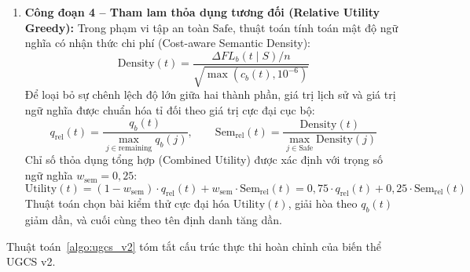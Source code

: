 \begin{enumerate}
    \item \textbf{Công đoạn 4 -- Tham lam thỏa dụng tương đối (Relative Utility Greedy):}
    Trong phạm vi tập an toàn $\text{Safe}$, thuật toán tính toán mật độ ngữ nghĩa có nhận thức chi phí (Cost-aware Semantic Density):
    \begin{equation}
    \text{Density}(t) = \frac{\Delta FL_b(t \mid S) / n}{\sqrt{\max(c_b(t), 10^{-6})}}
    \end{equation}
    Để loại bỏ sự chênh lệch độ lớn giữa hai thành phần, giá trị lịch sử và giá trị ngữ nghĩa được chuẩn hóa tỉ đối theo giá trị cực đại cục bộ:
    \begin{equation}
    q_{\text{rel}}(t) = \frac{q_b(t)}{\max_{j \in \text{remaining}} q_b(j)}, \qquad \text{Sem}_{\text{rel}}(t) = \frac{\text{Density}(t)}{\max_{j \in \text{Safe}} \text{Density}(j)}
    \end{equation}
    Chỉ số thỏa dụng tổng hợp (Combined Utility) được xác định với trọng số ngữ nghĩa $w_{\text{sem}} = 0{,}25$:
    \begin{equation}
    \text{Utility}(t) = (1 - w_{\text{sem}}) \cdot q_{\text{rel}}(t) + w_{\text{sem}} \cdot \text{Sem}_{\text{rel}}(t) = 0{,}75 \cdot q_{\text{rel}}(t) + 0{,}25 \cdot \text{Sem}_{\text{rel}}(t)
    \end{equation}
    Thuật toán chọn bài kiểm thử cực đại hóa $\text{Utility}(t)$, giải hòa theo $q_b(t)$ giảm dần, và cuối cùng theo tên định danh tăng dần.
\end{enumerate}

Thuật toán~\ref{algo:ugcs_v2} tóm tắt cấu trúc thực thi hoàn chỉnh của biến thể UGCS v2.

